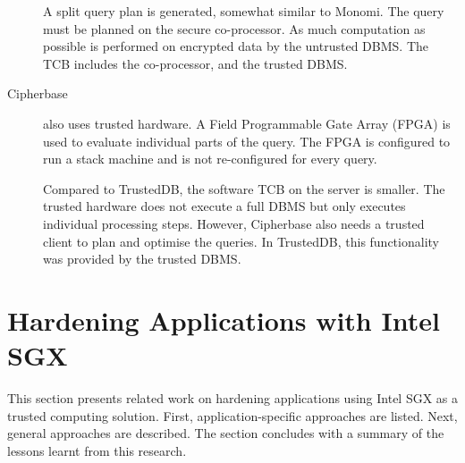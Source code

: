 \begin{description}
A split query plan is generated, somewhat similar to Monomi.\label{ID_901389530}
The query must be planned on the secure co-processor.\label{ID_861845571}
As much computation as possible is performed on encrypted data by the untrusted DBMS.\label{ID_707333235}
The TCB includes the co-processor, and the trusted DBMS.\label{ID_236700381}
\item[Cipherbase\cite{Arasu2013}]\label{ID_647732342}
also uses trusted hardware. A Field Programmable Gate Array (FPGA) is used to evaluate individual parts of the query.\label{ID_607204959}
The FPGA is configured to run a stack machine and is not re-configured for every query.\label{ID_531408524}

Compared to TrustedDB, the software TCB on the server is smaller. The trusted hardware does not execute a full DBMS but only executes individual processing steps.\label{ID_901865989}
However, Cipherbase also needs a trusted client to plan and optimise the queries.\label{ID_1815923549}
In TrustedDB, this functionality was provided by the trusted DBMS.\label{ID_1359181334}
\end{description}\label{ID_422481189}

\section{Hardening Applications with Intel SGX\label{ID_930530989}\label{section:sgx-hardening}}
This section presents related work on hardening applications using Intel SGX as a trusted computing solution.\label{ID_795492685}
First, application-specific approaches are listed. Next, general approaches are described.\label{ID_843125457}
The section concludes with a summary of the lessons learnt from this research.\label{ID_1682307076}

